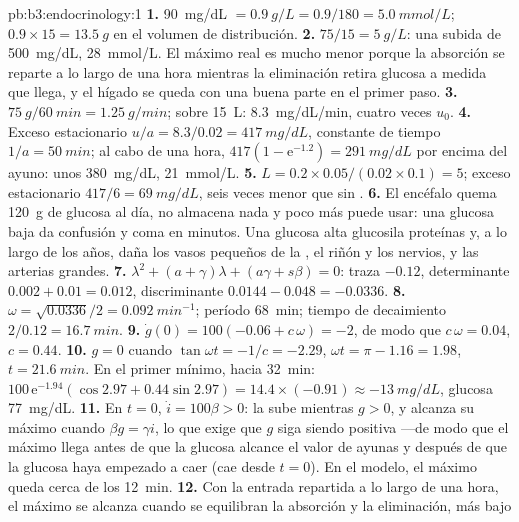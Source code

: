 \begin{solution}{pb:b3:endocrinology:1}
\textbf{1.} \qty{90}{mg/dL} $= \qty{0.9}{g/L} = 0.9/180 = \qty{5.0}{mmol/L}$;
$0.9\times 15 = \qty{13.5}{g}$ en el volumen de distribución.
\textbf{2.} $75/15 = \qty{5}{g/L}$: una subida de \qty{500}{mg/dL},
\qty{28}{mmol/L}. El máximo real es mucho menor porque la absorción se
reparte a lo largo de una hora mientras la eliminación retira glucosa a
medida que llega, y el hígado se queda con una buena parte en el primer
paso.
\textbf{3.} $\qty{75}{g}/\qty{60}{min} = \qty{1.25}{g/min}$; sobre
\qty{15}{L}: \qty{8.3}{mg/dL/min}, cuatro veces $u_{0}$.
\textbf{4.} Exceso estacionario $u/a = 8.3/0.02 = \qty{417}{mg/dL}$,
constante de tiempo $1/a = \qty{50}{min}$; al cabo de una hora, $417(1 -
\mathrm{e}^{-1.2}) = \qty{291}{mg/dL}$ por encima del ayuno: unos
\qty{380}{mg/dL}, \qty{21}{mmol/L}.
\textbf{5.} $L = 0.2\times 0.05/(0.02\times 0.1) = 5$; exceso
estacionario $417/6 = \qty{69}{mg/dL}$, seis veces menor que sin
.
\textbf{6.} El encéfalo quema \qty{120}{g} de glucosa al día, no
almacena nada y poco más puede usar: una glucosa baja da confusión y
coma en minutos. Una glucosa alta glucosila proteínas y, a lo largo de
los años, daña los vasos pequeños de la , el riñón y los nervios,
y las arterias grandes.
\textbf{7.} $\lambda^{2} + (a + \gamma)\lambda + (a\gamma + s\beta) = 0$:
traza $-0.12$, determinante $0.002 + 0.01 = 0.012$, discriminante
$0.0144 - 0.048 = -0.0336$.
\textbf{8.} $\omega = \sqrt{0.0336}/2 = \qty{0.092}{min^{-1}}$; período
\qty{68}{min}; tiempo de decaimiento $2/0.12 = \qty{16.7}{min}$.
\textbf{9.} $\dot g(0) = 100(-0.06 + c\,\omega) = -2$, de modo que $c\,\omega =
0.04$, $c = 0.44$.
\textbf{10.} $g = 0$ cuando $\tan\omega t = -1/c = -2.29$, $\omega t =
\pi - 1.16 = 1.98$, $t = \qty{21.6}{min}$. En el primer mínimo, hacia
\qty{32}{min}: $100\,\mathrm{e}^{-1.94}(\cos 2.97 + 0.44\sin 2.97) =
14.4\times(-0.91) \approx -\qty{13}{mg/dL}$, glucosa \qty{77}{mg/dL}.
\textbf{11.} En $t = 0$, $\dot i = 100\beta > 0$: la  sube
mientras $g > 0$, y alcanza su máximo cuando $\beta g = \gamma i$, lo
que exige que $g$ siga siendo positiva ---de modo que el máximo llega
antes de que la glucosa alcance el valor de ayunas y después de que la
glucosa haya empezado a caer (cae desde $t = 0$). En el modelo, el
máximo queda cerca de los \qty{12}{min}.
\textbf{12.} Con la entrada repartida a lo largo de una hora, el máximo
se alcanza cuando se equilibran la absorción y la eliminación, más bajo

\end{solution}
